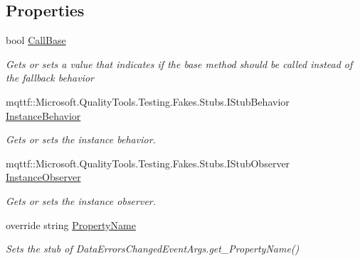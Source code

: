 \subsection*{Properties}
\begin{DoxyCompactItemize}
\item 
bool \hyperlink{class_system_1_1_component_model_1_1_fakes_1_1_stub_data_errors_changed_event_args_aa3da6da973b75920729bb4efd866942a}{Call\-Base}
\begin{DoxyCompactList}\small\item\em Gets or sets a value that indicates if the base method should be called instead of the fallback behavior\end{DoxyCompactList}\item 
mqttf\-::\-Microsoft.\-Quality\-Tools.\-Testing.\-Fakes.\-Stubs.\-I\-Stub\-Behavior \hyperlink{class_system_1_1_component_model_1_1_fakes_1_1_stub_data_errors_changed_event_args_aadc3a79ef1e32d12987100388fb441f6}{Instance\-Behavior}
\begin{DoxyCompactList}\small\item\em Gets or sets the instance behavior.\end{DoxyCompactList}\item 
mqttf\-::\-Microsoft.\-Quality\-Tools.\-Testing.\-Fakes.\-Stubs.\-I\-Stub\-Observer \hyperlink{class_system_1_1_component_model_1_1_fakes_1_1_stub_data_errors_changed_event_args_ae677ca2f340cf9914d2ab8a333b76d3d}{Instance\-Observer}
\begin{DoxyCompactList}\small\item\em Gets or sets the instance observer.\end{DoxyCompactList}\item 
override string \hyperlink{class_system_1_1_component_model_1_1_fakes_1_1_stub_data_errors_changed_event_args_ab765a0ef268c30d6ef363a32b549f4e4}{Property\-Name}
\begin{DoxyCompactList}\small\item\em Sets the stub of Data\-Errors\-Changed\-Event\-Args.\-get\-\_\-\-Property\-Name()\end{DoxyCompactList}\end{DoxyCompactItemize}


